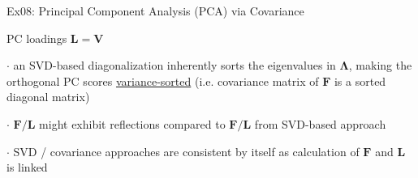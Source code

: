\documentclass[mathserif, aspectratio=1610]{intbeamer}
\begin{document}
\begin{frame}[t]{Ex08: Principal Component Analysis (PCA) via Covariance}
\begin{minipage}[t]{0.49\textwidth}
PC loadings $\bm{L} = \bm{V}$

\end{minipage}

\vspace{0.5em}

$\cdot$ an SVD-based diagonalization inherently sorts the eigenvalues in $\bm{\Lambda}$, making the orthogonal PC scores \underline{variance-sorted} (i.e. covariance matrix of $\bm{F}$ is a sorted diagonal matrix)

$\cdot$ $\bm{F} / \bm{L}$ might exhibit reflections compared to $\bm{F} / \bm{L}$ from SVD-based approach

$\cdot$ SVD / covariance approaches are consistent by itself as calculation of $\bm{F}$ and $\bm{L}$ is linked

\end{frame}
\end{document}
